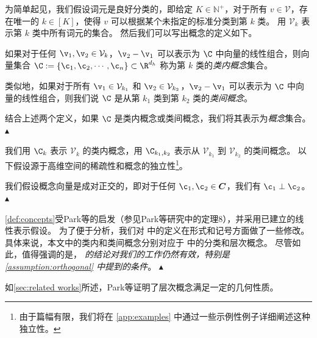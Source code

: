 为简单起见，我们假设词元是良好分类的，即给定 $K \in \mathbb{N}^+$，对于所有 $v \in \mathcal{V}$，存在唯一的 $k \in [K]$，使得 $v$ 可以根据某个未指定的标准分类到第 $k$ 类。
用 $\mathcal{V}_k$ 表示第 $k$ 类中所有词元的集合。
然后我们可以写出概念的定义如下。

\begin{definition}[概念]
\label{def:concepts}
如果对于任何 $\v_1, \v_2 \in \mathcal{V}_k$，$\v_2 - \v_1$ 可以表示为 $\C$ 中向量的线性组合，则向量集合 $\C := \{\c_1, \c_2, \cdots, \c_n\} \subset \R^{d_h}$ 称为第 $k$ 类的\textit{类内概念}集合。 

类似地，如果对于所有 $\v_1 \in \mathcal{V}_{k_1}$ 和 $\v_2 \in \mathcal{V}_{k_2}$，$\v_2 - \v_1$ 可以表示为 $\C$ 中向量的线性组合，则我们说 $\C$ 是从第 $k_1$ 类到第 $k_2$ 类的\textit{类间概念}。

结合上述两个定义，如果 $\C$ 是类内概念或类间概念，我们将其表示为\textit{概念}集合。 \hfill $\blacktriangle$
\end{definition}

我们用 $\C_k$ 表示 $\mathcal{V}_k$ 的类内概念，用 $\C_{k_1, k_2}$ 表示从 $\mathcal{V}_{k_1}$ 到 $\mathcal{V}_{k_2}$ 的类间概念。
以下假设源于高维空间的稀疏性和概念的独立性\footnote{由于篇幅有限，我们将在 \cref{app:examples} 中通过一些示例性例子详细阐述这种独立性。}。

\begin{definition}
\label{assumption:orthogonal}
我们假设概念向量是成对正交的，即对于任何 $\c_1, \c_2 \in \boldsymbol{C}$，我们有 $\c_1 \perp \c_2$。 \hfill $\blacktriangle$
\end{definition}

\begin{remark}
\cref{def:concepts}受Park等\cite{DBLP:conf/iclr/0001CJV25}的启发（参见Park等\cite{DBLP:conf/iclr/0001CJV25}研究中的定理8），并采用已建立的线性表示假设\cite{DBLP:conf/naacl/MikolovYZ13,DBLP:conf/blackboxnlp/NandaLW23,DBLP:journals/corr/abs-2308-10248,DBLP:conf/nips/WangGNV23}。
为了便于分析，我们对\citet{DBLP:conf/iclr/0001CJV25} 中的定义在形式和记号方面做了一些修改。具体来说，本文中的类内和类间概念分别对应于 \citet{DBLP:conf/iclr/0001CJV25} 中的分类和层次概念。 
尽管如此，值得强调的是，\textit{\citet{DBLP:conf/iclr/0001CJV25} 的结论对我们的工作仍然有效，特别是 \cref{assumption:orthogonal} 中提到的条件}。 \hfill $\blacktriangle$
\end{remark}

如\cref{sec:related works}所述，Park等\cite{DBLP:conf/iclr/0001CJV25}证明了层次概念满足一定的几何性质。

